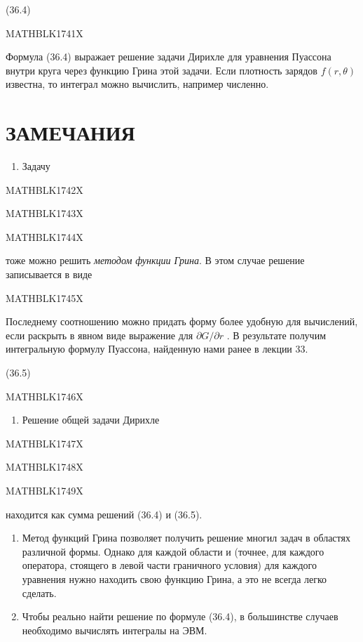 \documentclass[
]{article}
\providecommand{\tightlist}{%
  \setlength{\itemsep}{0pt}\setlength{\parskip}{0pt}}
\begin{document}
(36.4)

MATHBLK1741X

Формула (36.4) выражает решение задачи Дирихле для уравнения Пуассона
внутри круга через функцию Грина этой задачи. Если плотность зарядов
\(f(r, \theta)\) известна, то интеграл можно вычислить, например
численно.

\section{ЗАМЕЧАНИЯ}\label{ux437ux430ux43cux435ux447ux430ux43dux438ux44f-15}

\begin{enumerate}
\def\labelenumi{\arabic{enumi}.}
\tightlist
\item
  Задачу
\end{enumerate}

MATHBLK1742X

MATHBLK1743X

MATHBLK1744X

тоже можно решить \emph{методом функции Грина}. В этом случае решение
записывается в виде

MATHBLK1745X

Последнему соотношению можно придать форму более удобную для вычислений,
если раскрыть в явном виде выражение для \(\partial G/\partial r\) . В
результате получим интегральную формулу Пуассона, найденную нами ранее в
лекции 33.

(36.5)

MATHBLK1746X

\begin{enumerate}
\def\labelenumi{\arabic{enumi}.}
\setcounter{enumi}{1}
\tightlist
\item
  Решение общей задачи Дирихле
\end{enumerate}

MATHBLK1747X

MATHBLK1748X

MATHBLK1749X

находится как сумма решений (36.4) и (36.5).

\begin{enumerate}
\def\labelenumi{\arabic{enumi}.}
\setcounter{enumi}{2}
\item
  Метод функций Грина позволяет получить решение многил задач в областях
  различной формы. Однако для каждой области и (точнее, для каждого
  оператора, стоящего в левой части граничного условия) для каждого
  уравнения нужно находить свою функцию Грина, а это не всегда легко
  сделать.
\item
  Чтобы реально найти решение по формуле (36.4), в большинстве случаев
  необходимо вычислять интегралы на ЭВМ.
\end{enumerate}
\end{document}
